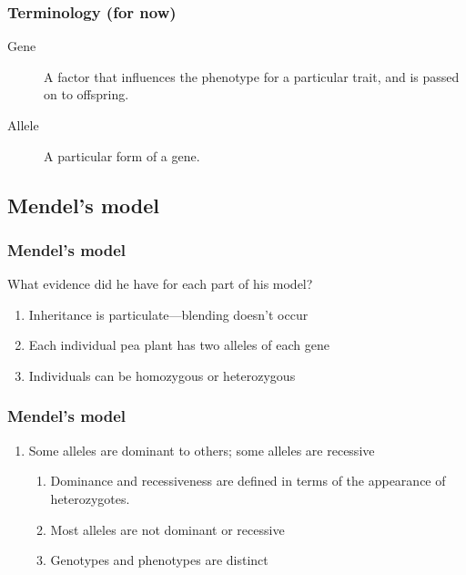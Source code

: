 \begin{frame}
    \frametitle{Terminology (for now)}
    \begin{description}
        \item[Gene] A factor that influences the phenotype for a
                particular trait, and is passed on to offspring.
        \item[Allele] A particular form of a gene.
    \end{description}
\end{frame}

\subsection{Mendel's model}

\begin{frame}
    \frametitle{Mendel's model}
    What evidence did he have for each part of his model?

    \begin{enumerate}
        \item Inheritance is particulate---blending doesn't occur
        \item Each individual pea plant has two alleles of each gene
        \item Individuals can be homozygous or heterozygous
    \end{enumerate}
\end{frame}

\begin{frame}
    \frametitle{Mendel's model}
    \begin{enumerate}[<+->]
        \addtocounter{enumi}{3}
        \item Some alleles are dominant to others; some alleles are recessive
            \begin{enumerate}
                \item Dominance and recessiveness are defined 
                    in terms of the appearance of heterozygotes.
                \item Most alleles are not dominant or recessive
                \item Genotypes and phenotypes are distinct
            \end{enumerate}
    \end{enumerate}

\end{frame}

